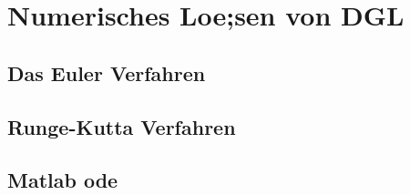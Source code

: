 \section{Numerisches Loe;sen von DGL}
\subsection{Das Euler Verfahren}
\subsection{Runge-Kutta Verfahren}
\subsection{Matlab ode}

